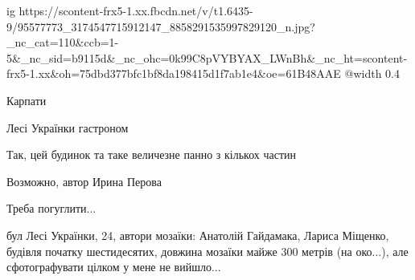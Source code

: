  
 
 
 
 

\ifcmt
  ig https://scontent-frx5-1.xx.fbcdn.net/v/t1.6435-9/95577773_3174547715912147_8858291535997829120_n.jpg?_nc_cat=110&ccb=1-5&_nc_sid=b9115d&_nc_ohc=0k99C8pVYBYAX_LWnBh&_nc_ht=scontent-frx5-1.xx&oh=75dbd377bfc1bf8da198415d1f7ab1e4&oe=61B48AAE
  @width 0.4
\fi

Карпати

Лесі Українки гастроном

Так, цей будинок та таке величезне панно з кількох частин

Возможно, автор Ирина Перова

Треба погуглити...


бул Лесі Українки, 24, автори мозаїки: Анатолій Гайдамака, Лариса Міщенко,
будівля початку шестидесятих, довжина мозаїки майже 300 метрів (на око...), але
сфотографувати цілком у мене не вийшло...

